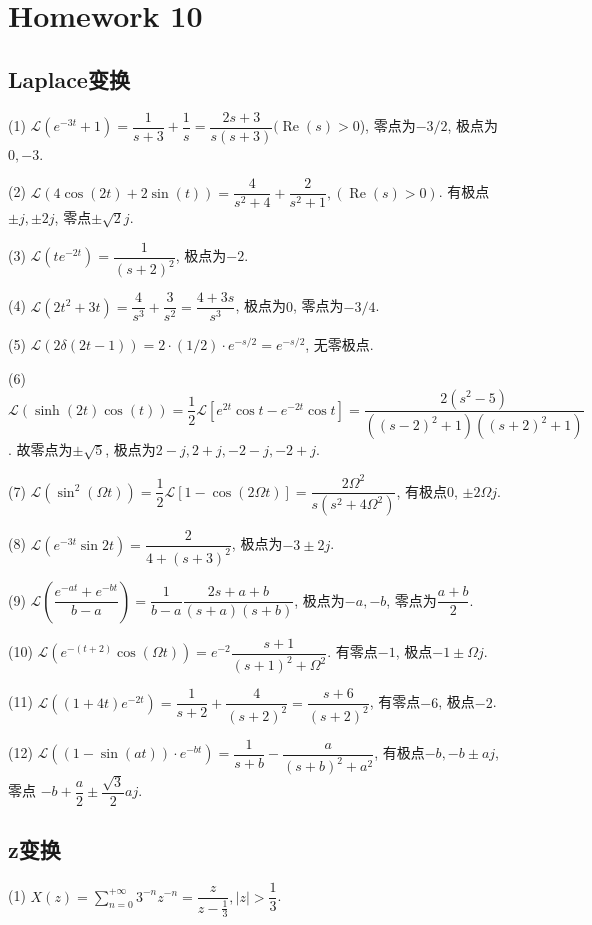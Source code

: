 \section{Homework 10}

\subsection{Laplace变换}

(1) $\mathscr{L}(e^{-3t}+1)=\dfrac{1}{s+3}+\dfrac{1}{s}=\dfrac{2s+3}{s(s+3)}(\operatorname{Re}(s)>0$), 
零点为$-3/2$, 极点为$0,-3$.

(2) $\mathscr{L}(4\cos(2t)+2\sin(t))=\dfrac{4}{s^2+4}+\dfrac{2}{s^2+1},(\operatorname{Re}(s)>0)$. 有极点$\pm j, \pm 2j$,
零点$\pm\sqrt{2}j$.

(3) $\mathscr{L}(te^{-2t})=\dfrac{1}{(s+2)^2}$, 极点为$-2$.

(4) $\mathscr{L}(2t^2+3t)=\dfrac{4}{s^3}+\dfrac{3}{s^2}=\dfrac{4+3s}{s^3}$, 极点为$0$, 零点为$-3/4$.

(5) $\mathscr{L}(2\delta(2t-1))=2\cdot (1/2)\cdot e^{-s/2}=e^{-s/2}$, 无零极点.

(6) $\mathscr{L}(\sinh(2t)\cos(t))=\dfrac{1}{2}\mathscr{L}[e^{2t}\cos t - e^{-2t}\cos t]=
\dfrac{2(s^2-5)}{((s-2)^2+1)((s+2)^2+1)}$. 故零点为$\pm\sqrt{5}$, 极点为$2-j,2+j,-2-j,-2+j$.

(7) $\mathscr{L}(\sin^2(\Omega t))=\dfrac12\mathscr{L}[1-\cos(2\Omega t)]=\dfrac{2\Omega^2}{s(s^2+4\Omega^2)}$,
有极点$0$, $\pm 2\Omega j$.

(8) $\mathscr{L}(e^{-3t}\sin 2t)=\dfrac{2}{4+(s+3)^2}$, 极点为$-3\pm2j$.

(9) $\mathscr{L}(\dfrac{e^{-at}+e^{-bt}}{b-a})=\dfrac{1}{b-a}\dfrac{2s+a+b}{(s+a)(s+b)}$, 极点为$-a,-b$, 零点为$
\dfrac{a+b}{2}$.

(10) $\mathscr{L}(e^{-(t+2)}\cos(\Omega t))=e^{-2}\dfrac{s+1}{(s+1)^2+\Omega^2}$. 有零点$-1$, 极点$-1\pm \Omega j$.

(11) $\mathscr{L}((1+4t)e^{-2t})=\dfrac{1}{s+2}+\dfrac{4}{(s+2)^2}=\dfrac{s+6}{(s+2)^2}$, 有零点$-6$, 极点$-2$.

(12) $\mathscr{L}((1-\sin(at))\cdot e^{-bt})=\dfrac{1}{s+b}-\dfrac{a}{(s+b)^2+a^2}$, 有极点$-b,-b\pm aj$, 零点
$-b+\dfrac a 2 \pm \dfrac{\sqrt{3}}{2}aj$.

\subsection{z变换}

(1) $X(z)=\displaystyle\sum_{n=0}^{+\infty}3^{-n}z^{-n}=\dfrac{z}{z-\frac{1}{3}}, |z|>\dfrac{1}{3}$.

